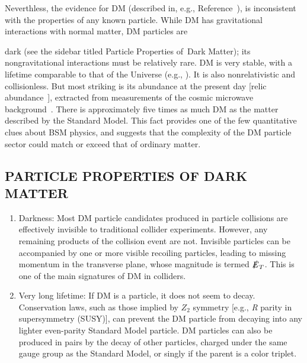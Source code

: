 \documentclass{ar-1col}
\newcommand{\MET}{\ensuremath{\slashed{E}_T}\xspace}
\begin{document}
Neverthless, the evidence for DM (described in, e.g., Reference~), is inconsistent with the properties of any known 
particle. While DM has gravitational interactions with normal matter, DM particles are {dark (see the sidebar titled Particle Properties of\ Dark Matter); its nongravitational
interactions must be relatively rare. DM is very stable, with a lifetime comparable to that of the Universe (e.g., ).
It is also nonrelativistic and collisionless. 
But most striking is its abundance at the present day [relic abundance~\cite{Ellis:1999mm}],
extracted from measurements of the cosmic microwave background~\cite{Ade:2015xua}.
There is approximately five times as much DM as the matter described by the Standard Model. 
This fact provides one of the few quantitative clues about BSM physics, and suggests that 
the complexity of the DM particle sector could match or exceed that of ordinary matter.

\begin{textbox}
\section{PARTICLE PROPERTIES OF DARK MATTER}

 \begin{enumerate}  

\item Darkness: Most DM particle candidates produced in particle collisions are effectively invisible to traditional collider experiments. However, any remaining products of the collision event are not. Invisible particles can be
accompanied by one or more visible recoiling particles, leading to
missing momentum in the transverse plane, whose magnitude is
termed \MET. This is one of the main signatures of DM in
colliders.

\item Very long lifetime: If DM is a particle, it does not seem to decay.
Conservation laws, such as those implied by $Z_2$ symmetry [e.g., \textit{R} parity in supersymmetry (SUSY)], 
can prevent the DM particle from decaying into any
lighter even-parity Standard Model particle. DM particles can also be produced in pairs by the decay of other particles, charged
under the same gauge group as the Standard Model, or singly if the
parent is a color triplet.

 \end{enumerate}  

\end{textbox}


}
\end{document}
